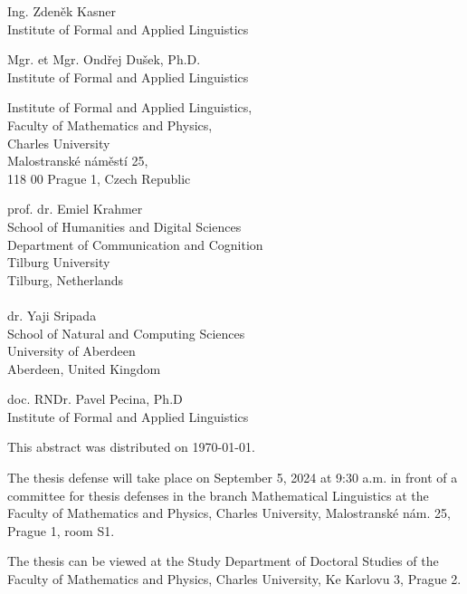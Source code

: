 \documentclass[12pt,notitlepage,a4paper,openright]{report}
\begin{document}
\begin{description}[leftmargin=15.5em,labelwidth=15.5em,labelindent=0em,labelsep=0em]
  \item[Doctoral Candidate:] Ing. Zdeněk Kasner\\Institute of Formal and Applied Linguistics
  \item[Supervisor:] Mgr. et Mgr. Ondřej Dušek, Ph.D.\\Institute of Formal and Applied Linguistics
  \item[Department:]  Institute of Formal and Applied Linguistics,
    \\Faculty of Mathematics and Physics,
    \\Charles University
    \\Malostranské náměstí 25,
    \\118 00 Prague 1, Czech Republic

  \item[Opponents:] prof. dr. Emiel Krahmer\\School of Humanities and Digital Sciences\\Department of Communication and Cognition\\Tilburg University\\Tilburg, Netherlands\\ \\ dr. Yaji Sripada\\ School of Natural and Computing Sciences\\University of Aberdeen\\Aberdeen, United Kingdom

  \item[Chairman of Academic Council:] doc. RNDr. Pavel Pecina, Ph.D\\Institute of Formal and Applied Linguistics
\end{description}

\vfill
\noindent This abstract was distributed on \today.

\vspace{0.5cm}

\noindent The thesis defense will take place on September 5, 2024 at 9:30 a.m. in front of a committee for thesis defenses in the branch Mathematical Linguistics at the Faculty of Mathematics and Physics, Charles University, Malostranské nám. 25, Prague 1, room S1.

\vspace{0.5cm}

\noindent The thesis can be viewed at the Study Department of Doctoral Studies of the Faculty of Mathematics and Physics, Charles University, Ke Karlovu 3, Prague 2.
\end{document}
